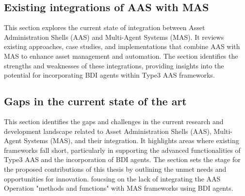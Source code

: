 \subsection{Existing integrations of AAS with MAS}
\begin{tcolorbox}[colback=yellow!5!white,colframe=yellow!75!black,
  title=About Existing Integrations of AAS with MAS]
  This section explores the current state of integration between Asset Administration Shells (AAS) and Multi-Agent Systems (MAS). It reviews existing approaches, case studies, and implementations that combine AAS with MAS to enhance asset management and automation. The section identifies the strengths and weaknesses of these integrations, providing insights into the potential for incorporating BDI agents within Type3 AAS frameworks.
\end{tcolorbox}

\subsection{Gaps in the current state of the art}
\begin{tcolorbox}[colback=yellow!5!white,colframe=yellow!75!black,
  title=About Gaps in the Current State of the Art]
  This section identifies the gaps and challenges in the current research and development landscape related to Asset Administration Shells (AAS), Multi-Agent Systems (MAS), and their integration. It highlights areas where existing frameworks fall short, particularly in supporting the advanced functionalities of Type3 AAS and the incorporation of BDI agents. The section sets the stage for the proposed contributions of this thesis by outlining the unmet needs and opportunities for innovation.
  foucsing on the lack of integrating the AAS Operation "methods and functions" with MAS frameworks using BDI agents.
\end{tcolorbox}
